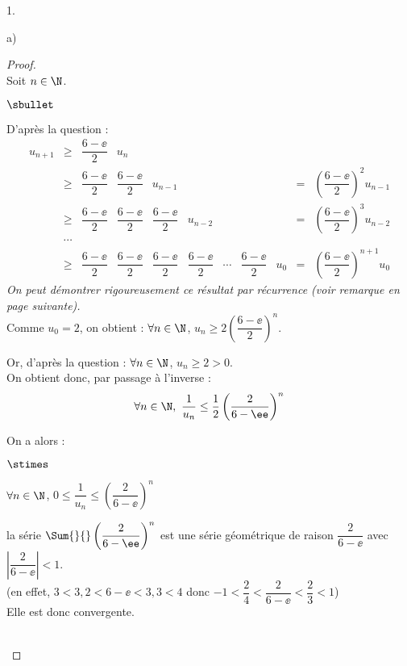 \documentclass[11pt]{article}%
\begin{document}
\begin{noliste}{1.}
\begin{noliste}{a)}
    \begin{proof}~\\
      Soit $n\in\N$.
      \begin{noliste}{$\sbullet$}
      \item D'après la question  :
        \[
        \begin{array}{rclllllllll}
          u_{n+1} & \geq & \dfrac{6-\ee}{2} & u_n
          \\[.4cm]
          & \geq & \dfrac{6-\ee}{2} & \dfrac{6-\ee}{2}
          &  u_{n-1} & & & &
          & = & \left(\dfrac{6-\ee}{2}\right)^2 u_{n-1}
          \\[.4cm]
          & \geq & \dfrac{6-\ee}{2} & \dfrac{6-\ee}{2} & 
          \dfrac{6-\ee}{2} & u_{n-2} & & &
          & = & \left(\dfrac{6-\ee}{2}\right)^3 u_{n-2}
          \\[.4cm]
          & \cdots & 
          \\[.2cm]
          & \geq & \dfrac{6-\ee}{2} & \dfrac{6-\ee}{2} &
          \dfrac{6-\ee}{2} & \dfrac{6-\ee}{2} & \cdots 
          & \dfrac{6-\ee}{2} & u_0 
          & = & \left(\dfrac{6-\ee}{2}\right)^{n+1} u_0
        \end{array}
        \]
        {\it On peut démontrer rigoureusement ce résultat par
          récurrence (voir remarque en page suivante).  }\\
        Comme $u_0=2$, on obtient : $\forall n\in\N$, $u_n \geq 2
        \left(\dfrac{6-\ee}{2}\right)^n$.
      \item Or, d'après la question  : $\forall n\in\N$,
        $u_n\geq 2 >0$.\\
        On obtient donc, par passage à l'inverse :
        \[
        \forall n \in \N, \ \dfrac{1}{u_n} \leq \dfrac{1}{2}
        \left(\dfrac{2}{6-\ee}\right)^n
        \]
      \item On a alors :
        \begin{noliste}{$\stimes$}
        \item $\forall n \in \N$, $0\leq \dfrac{1}{u_n} \leq
          \left(\dfrac{2}{6-\ee}\right)^n$
        \item la série $\Sum{}{} \left(\dfrac{2}{6-\ee}\right)^n$ est
          une série géométrique de raison $\dfrac{2}{6-\ee}$ avec
          $\left\vert
            \dfrac{2}{6-\ee} \right\vert <1$.\\[.2cm]
          (en effet, $3<3,2<6-\ee<3,3<4$ donc
          $-1<\dfrac{2}{4}<\dfrac{2}{6-\ee}<\dfrac{2}{3}<1$)\\
          Elle est donc convergente.
        \end{noliste}
      \end{noliste}
  
  



  ~\\[-1.4cm]
\end{proof}
\end{noliste}
\end{noliste}
\end{document}
